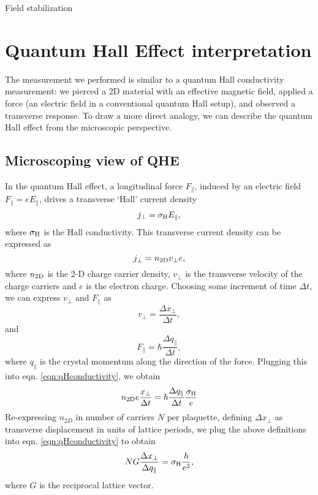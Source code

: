 	Field stabilization

\section{Quantum Hall Effect interpretation}

The measurement we performed is similar to a quantum Hall conductivity measurement: we pierced a 2D material with an effective magnetic field, applied a force (an electric field in a conventional quantum Hall setup), and observed a transverse response. To draw a more direct analogy, we can describe the quantum Hall effect from the microscopic perspective. 

\subsection{Microscoping view of QHE}
In the quantum Hall effect, a longitudinal force $F_{\parallel}$, induced by an electric field $F_{\parallel}=e E_{\parallel}$, drives a transverse `Hall' current density 
\begin{equation}
j_{\perp} = \sigma_{\rm{H}} E_{\parallel},
\label{eqn:qHconductivity}
\end{equation}
where $\sigma_{\rm{H}}$ is the Hall conductivity.  This transverse current density can be expressed as 
\begin{equation}
j_{\perp}=n_{2\rm{D}}v_{\perp}e,
\end{equation}
where $n_{2\rm{D}}$ is the 2-D charge carrier density, $v_{\perp}$ is the transverse velocity of the charge carriers and $e$ is the electron charge. Choosing some increment of time $\Delta t$, we can express $v_{\perp}$ and $F_{\parallel}$ as 
\begin{equation}
v_{\perp}=\frac{\Delta x_{\perp}}{\Delta t},
\end{equation}
and 
\begin{equation}
F_{\parallel} = \hbar \frac{\Delta q_{\parallel}}{\Delta t},
\end{equation}
where $q_{\parallel}$ is the crystal momentum along the direction of the force. Plugging this into eqn. \ref{eqn:qHconductivity}, we obtain
\begin{equation}
n_{2{\rm D}} e  \frac{x_{\perp}}{\Delta t} = \hbar \frac{\Delta q_{\parallel}}{\Delta t} \frac{\sigma_{\rm H}}{e}
\end{equation}
 Re-expressing $n_{2D}$ in number of carriers $N$ per plaquette, defining $\Delta x_{\perp}$ as transverse displacement in units of lattice periods, we plug the above definitions into eqn. \ref{eqn:qHconductivity} to obtain
\begin{equation}
N G\frac{\Delta x_{\perp}}{\Delta q_{\parallel}}=\sigma_{\rm{H}} \frac{h}{e^2},
\end{equation}
where $G$ is the reciprocal lattice vector.  

